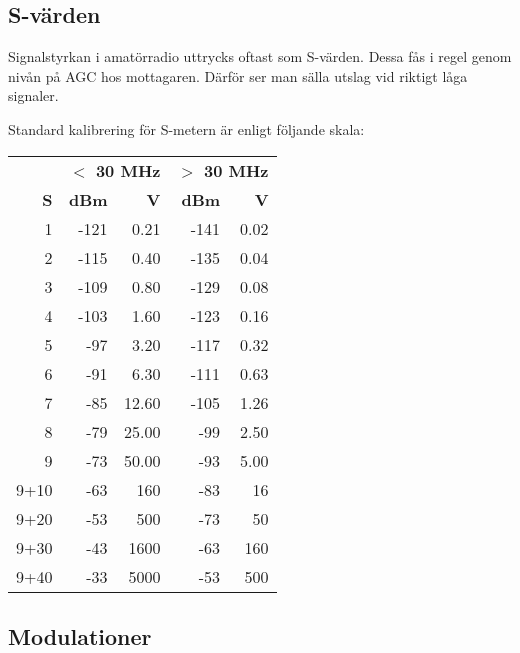\subsection{S-värden}

Signalstyrkan i amatörradio uttrycks oftast som S-värden. Dessa fås i regel genom nivån på AGC hos mottagaren. Därför ser man sälla utslag vid riktigt låga signaler.

Standard kalibrering för S-metern är enligt följande skala:

\begin{center}
\begin{longtable}{r|rr|rr}
	     & \multicolumn{2}{c|}{\textbf{$<$ 30 MHz}} & \multicolumn{2}{c}{\textbf{$>$ 30 MHz}} \\ 
	   \textbf{S} &  \textbf{dBm} &                \textbf{\textmu V} &  \textbf{dBm} &               \textbf{\textmu V} \\ \hline \endhead
	   1 & -121 &                     0.21 & -141 &                    0.02 \\
	   2 & -115 &                     0.40 & -135 &                    0.04 \\
	   3 & -109 &                     0.80 & -129 &                    0.08 \\
	   4 & -103 &                     1.60 & -123 &                    0.16 \\
	   5 &  -97 &                     3.20 & -117 &                    0.32 \\
	   6 &  -91 &                     6.30 & -111 &                    0.63 \\
	   7 &  -85 &                    12.60 & -105 &                    1.26 \\
	   8 &  -79 &                    25.00 &  -99 &                    2.50 \\
	   9 &  -73 &                    50.00 &  -93 &                    5.00 \\
	9+10 &  -63 &                      160 &  -83 &                      16 \\
	9+20 &  -53 &                      500 &  -73 &                      50 \\
	9+30 &  -43 &                     1600 &  -63 &                     160 \\
	9+40 &  -33 &                     5000 &  -53 &                     500
\end{longtable}
\end{center}

\subsection{Modulationer}

